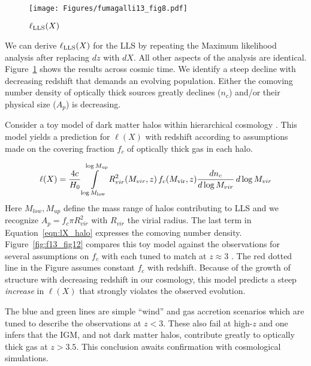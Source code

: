 \documentclass[graybox]{svmult}
\def\intl{\int\limits}
\begin{document}
%
\begin{figure}[b]
\sidecaption
\texttt{[image: Figures/fumagalli13\_fig8.pdf]}
%
%
\caption{$\ell_{\rm LLS}(X)$
}
\label{fig:lX_LLS}       %
\end{figure}

We can derive $\ell_{\rm LLS}(X)$ for the LLS by 
repeating the Maximum likelihood analysis after
replacing $dz$ with $dX$.  All other aspects of the 
analysis are identical.
Figure~\ref{fig:lX_LLS} shows the results across
cosmic time.
We identify a steep decline with decreasing
redshift that demands an evolving population.
Either the comoving number density of optically thick sources
greatly declines ($n_c$) and/or their physical size ($A_p$)
is decreasing.

Consider a toy model of dark matter halos within hierarchical
cosmology \cite{f13}.  This model yields a prediction for
$\ell(X)$ with redshift according to assumptions made on the
covering fraction $f_c$ of optically thick gas in each halo.

\begin{equation}
\ell(X) = \frac{4c}{H_0} \intl_{\log M_{\rm low}}^{\log M_{\rm up}}
R_{vir}^2 (M_{vir}, z) \, f_c(M_{\rm vir}, z) 
\frac{d n_c}{d \log M_{vir}} \, d\log M_{vir}
\label{eqn:lX_halo}
\end{equation}
Here $M_{low}, M_{up}$ define the mass range of halos contributing to LLS
and we recognize $A_p = f_c \pi R_{vir}^2$
with $R_{vir}$ the virial radius.
The last term in Equation~\ref{eqn:lX_halo}
expresses the comoving number density.
Figure~\ref{fig:f13_fig12} compares this toy model against
the observations for several assumptions on $f_c$ with each
tuned to match at $z \approx 3$
\cite{f13}.  The red dotted line in the Figure assumes
constant $f_c$ with redshift.  Because of the growth of
structure with decreasing redshift in our cosmology,
this model predicts a steep {\it increase} in $\ell(X)$
that strongly violates the observed evolution.

The blue and green lines are simple ``wind'' and gas accretion
scenarios which are tuned to describe the observations
at $z<3$. These also fail at high-$z$
and one infers that the IGM, and not dark matter halos, contribute
greatly to optically thick gas at $z>3.5$.
This conclusion awaits confirmation with cosmological simulations.
\end{document}
